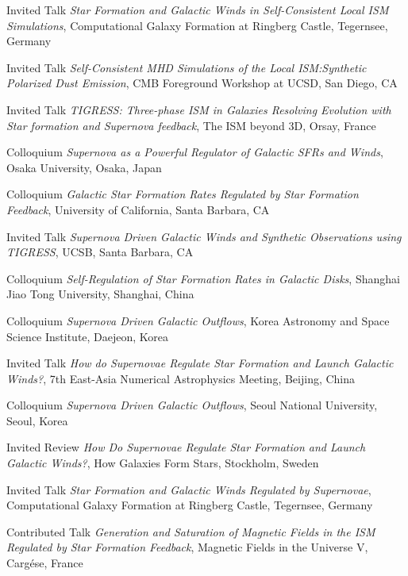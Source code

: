 \documentclass[12pt]{article}
\begin{document}
{Invited Talk}
{\emph{Star Formation and Galactic Winds in Self-Consistent Local ISM Simulations},
Computational Galaxy Formation at Ringberg Castle,
Tegernsee, Germany}

{Invited Talk}
{\emph{Self-Consistent MHD Simulations of the Local ISM:Synthetic Polarized Dust Emission},
CMB Foreground Workshop at UCSD,
San Diego, CA}

{Invited Talk}
{\emph{TIGRESS: Three-phase ISM in Galaxies Resolving Evolution with Star formation and Supernova feedback},
The ISM beyond 3D,
Orsay, France}

{Colloquium}
{\emph{Supernova as a Powerful Regulator of Galactic SFRs and Winds},
Osaka University,
Osaka, Japan}

{Colloquium}
{\emph{Galactic Star Formation Rates Regulated by Star Formation Feedback},
University of California,
Santa Barbara, CA}

{Invited Talk}
{\emph{Supernova Driven Galactic Winds and Synthetic Observations using TIGRESS},
UCSB,
Santa Barbara, CA}

{Colloquium}
{\emph{Self-Regulation of Star Formation Rates in Galactic Disks},
Shanghai Jiao Tong University,
Shanghai, China}

{Colloquium}
{\emph{Supernova Driven Galactic Outflows},
Korea Astronomy and Space Science Institute,
Daejeon, Korea}

{Invited Talk}
{\emph{How do Supernovae Regulate Star Formation and Launch Galactic Winds?},
7th East-Asia Numerical Astrophysics Meeting,
Beijing, China}

{Colloquium}
{\emph{Supernova Driven Galactic Outflows},
Seoul National University,
Seoul, Korea}

{Invited Review}
{\emph{How Do Supernovae Regulate Star Formation and Launch Galactic Winds?},
How Galaxies Form Stars,
Stockholm, Sweden}

{Invited Talk}
{\emph{Star Formation and Galactic Winds Regulated by Supernovae},
Computational Galaxy Formation at Ringberg Castle,
Tegernsee, Germany}

{Contributed Talk}
{\emph{Generation and Saturation of Magnetic Fields in the ISM Regulated by Star Formation Feedback},
Magnetic Fields in the Universe V,
Carg\'ese, France}
\end{document}
